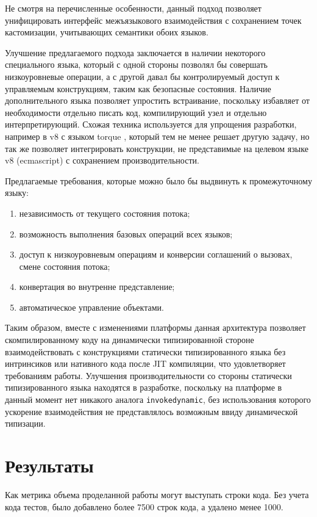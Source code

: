 \documentclass[times
]{itmo-student-thesis}
\begin{document}
\chapterconclusion
Не смотря на перечисленные особенности, данный подход позволяет унифицировать интерфейс межъязыкового взаимодействия с сохранением точек кастомизации, учитывающих семантики обоих языков.

Улучшение предлагаемого подхода заключается в наличии некоторого специального языка, который с одной стороны позволял бы совершать низкоуровневые операции, а с другой давал бы контролируемый доступ к управляемым конструкциям, таким как безопасные состояния. Наличие дополнительного языка позволяет упростить встраивание, поскольку избавляет от необходимости отдельно писать код, компилирующий узел и отдельно интерпретирующий. Схожая техника используется для упрощения разработки, например в v8 с языком torque \cite{torque}, который тем не менее решает другую задачу, но так же позволяет интегрировать конструкции, не представимые на целевом языке v8 (ecmascript) с сохранением производительности.

Предлагаемые требования, которые можно было бы выдвинуть к промежуточному языку:
\begin{enumerate}
	\item независимость от текущего состояния потока;
	\item возможность выполнения базовых операций всех языков;
	\item доступ к низкоуровневым операциям и конверсии соглашений о вызовах, смене состояния потока;
	\item конвертация во внутренне представление;
	\item автоматическое управление объектами.
\end{enumerate}
Таким образом, вместе с изменениями платформы данная архитектура позволяет скомпилированному коду на динамически типизированной стороне взаимодействовать с конструкциями статически типизированного языка без интринсиков или нативного кода после JIT компиляции, что удовлетворяет требованиям работы. Улучшения производительности со стороны статически типизированного языка находятся в разработке, поскольку на платформе в данный момент нет никакого аналога \texttt{invokedynamic}, без использования которого ускорение взаимодействия не представлялось возможным ввиду динамической типизации.

\chapter{Результаты}\label{ch:results}
Как метрика объема проделанной работы могут выступать строки кода. Без учета кода тестов, было добавлено более 7500 строк кода, а удалено менее 1000.
\end{document}
